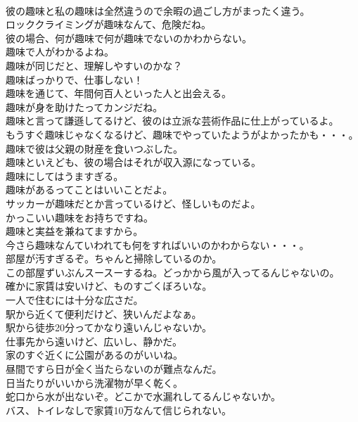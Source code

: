 \documentclass[8pt]{extreport}
\begin{document}
\begin{CJK}{UTF8}{min}
\\	彼の趣味と私の趣味は全然違うので余暇の過ごし方がまったく違う。	
\\	ロッククライミングが趣味なんて、危険だね。	
\\	彼の場合、何が趣味で何が趣味でないのかわからない。	
\\	趣味で人がわかるよね。	
\\	趣味が同じだと、理解しやすいのかな？	
\\	趣味ばっかりで、仕事しない！	
\\	趣味を通じて、年間何百人といった人と出会える。	
\\	趣味が身を助けたってカンジだね。	
\\	趣味と言って謙遜してるけど、彼のは立派な芸術作品に仕上がっているよ。	
\\	もうすぐ趣味じゃなくなるけど、趣味でやっていたようがよかったかも・・・。	
\\	趣味で彼は父親の財産を食いつぶした。	
\\	趣味といえども、彼の場合はそれが収入源になっている。	
\\	趣味にしてはうますぎる。	
\\	趣味があるってことはいいことだよ。	
\\	サッカーが趣味だとか言っているけど、怪しいものだよ。	
\\	かっこいい趣味をお持ちですね。	
\\	趣味と実益を兼ねてますから。	
\\	今さら趣味なんていわれても何をすればいいのかわからない・・・。	
\\	部屋が汚すぎるぞ。ちゃんと掃除しているのか。	
\\	この部屋ずいぶんスースーするね。どっかから風が入ってるんじゃないの。	
\\	確かに家賃は安いけど、ものすごくぼろいな。	
\\	一人で住むには十分な広さだ。	
\\	駅から近くて便利だけど、狭いんだよなぁ。	
\\	駅から徒歩20分ってかなり遠いんじゃないか。	
\\	仕事先から遠いけど、広いし、静かだ。	
\\	家のすぐ近くに公園があるのがいいね。	
\\	昼間ですら日が全く当たらないのが難点なんだ。	
\\	日当たりがいいから洗濯物が早く乾く。	
\\	蛇口から水が出ないぞ。どこかで水漏れしてるんじゃないか。	
\\	バス、トイレなしで家賃10万なんて信じられない。	

\end{CJK}
\end{document}
